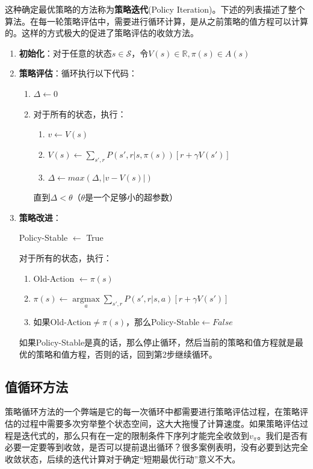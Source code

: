 \documentclass{ctexart}
\begin{document}
            这种确定最优策略的方法称为\textbf{策略迭代}(Policy Iteration)。下述的列表描述了整个算法。在每一轮策略评估中，需要进行循环计算，是从之前策略的值方程可以计算的。这样的方式极大的促进了策略评估的收敛方法。

            \begin{enumerate}
                \item \textbf{初始化}：对于任意的状态$s\in \mathcal{S}$，令$V(s)\in \mathbb{R},\pi(s)\in A(s)$
                \item \textbf{策略评估}：循环执行以下代码：
                \begin{enumerate}
                    \item $\Delta\leftarrow 0$
                    \item 对于所有的状态，执行：
                    \begin{enumerate}
                        \item $v \leftarrow V(s)$
                        \item $V(s) \leftarrow \sum_{s',r} P(s',r|s,\pi(s))[r + \gamma V(s')]$
                        \item $\Delta \leftarrow max(\Delta,|v-V(s)|)$
                    \end{enumerate}
                    直到$\Delta < \theta$（$\theta$是一个足够小的超参数）
                \end{enumerate}
                \item \textbf{策略改进}：

                    Policy-Stable $\leftarrow$ True

                    对于所有的状态，执行：
                    \begin{enumerate}
                        \item Old-Action $\leftarrow \pi(s)$
                        \item $\pi(s) \leftarrow \operatorname*{argmax}\limits_{a} \sum_{s',r} P(s',r|s,a)[r + \gamma V(s')]$
                        \item 如果Old-Action$\ne \pi(s)$，那么Policy-Stable$\leftarrow False$
                    \end{enumerate}
                    如果Policy-Stable是真的话，那么停止循环，然后当前的策略和值方程就是最优的策略和值方程，否则的话，回到第2步继续循环。
            \end{enumerate}

        \subsection{值循环方法}
            策略循环方法的一个弊端是它的每一次循环中都需要进行策略评估过程，在策略评估的过程中需要多次穷举整个状态空间，这大大拖慢了计算速度。如果策略评估过程是迭代式的，那么只有在一定的限制条件下序列才能完全收敛到$v_{\pi}$。我们是否有必要一定要等到收敛，是否可以提前退出循环？很多案例表明，没有必要到达完全收敛状态，后续的迭代计算对于确定“短期最优行动”意义不大。
\end{document}
